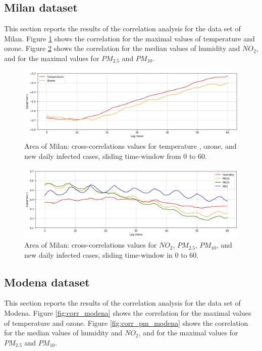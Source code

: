\documentclass[review]{elsarticle}
\begin{document}
\newpage \subsection{Milan dataset}
This section reports the results of the correlation analysis for the data set of Milan. 		Figure \ref{fig:corr_milan} shows the correlation for the maximal values of temperature 
 and ozone.
	Figure \ref{fig:corr_pm_milan} shows the correlation for the median values of humidity and $NO_{2}$, and for the 		maximal values for $PM_{2.5}$ and $PM_{10}$.
\begin{figure}[htp] 	\centering 	\includegraphics[width=1\linewidth]{img/corr_temp_milan.png} 	\caption{Area of Milan: cross-correlations values for temperature 
, ozone,
 and new daily infected cases, sliding time-window from $0$ to $60$.} 	\label{fig:corr_milan} \end{figure} 
 \begin{figure}[htp]	\centering	\includegraphics[width=1\linewidth]{img/corr_pm_milan.png}	\caption{Area of Milan: cross-correlations values for $NO_{2}$, $PM_{2.5}$, $PM_{10}$, and new daily infected cases, sliding time-window in $0$ to $60$.}	\label{fig:corr_pm_milan} \end{figure}
\newpage \subsection{Modena dataset}
This section reports the results of the correlation analysis for the data set of Modena. 		Figure \ref{fig:corr_modena} shows the correlation for the maximal values of temperature 
 and ozone.
	Figure \ref{fig:corr_pm_modena} shows the correlation for the median values of humidity and $NO_{2}$, and for the 		maximal values for $PM_{2.5}$ and $PM_{10}$.
\end{document}
